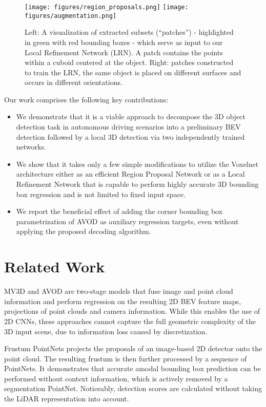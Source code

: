 \documentclass{article}
\begin{document}
\begin{figure}[ht!]
    \centering
    \texttt{[image: figures/region\_proposals.png]} \texttt{[image: figures/augmentation.png]}
    \caption{ Left: A visualization of extracted subsets (``patches'') - highlighted in green with red bounding boxes - which serve as input to our Local Refinement Network (LRN). A patch contains the points within a cuboid centered at the object. Right: patches constructed to train the LRN, the same object is placed on different surfaces and occurs in different orientations.}
    \label{fig:patches_vis}
\end{figure}


Our work comprises the following key contributions: 
\begin{itemize}
\item We demonstrate that it is a viable approach to decompose the 3D object detection task in autonomous driving scenarios into a preliminary BEV detection followed by a local 3D detection via two independently trained networks.
\item We show that it takes only a few simple modifications to utilize the Voxelnet \cite{Zhou2018voxel} architecture either as an efficient Region Proposal Network or as a Local Refinement Network that is capable to perform highly accurate 3D bounding box regression and is not limited to fixed input space. 
\item We report the beneficial effect of adding the corner bounding box parametrization of AVOD \cite{Ku2018avod} as auxiliary regression targets, even without applying the proposed decoding algorithm.
\end{itemize}


\section{Related Work}

MV3D \cite{Chen2017multiview} and AVOD \cite{Ku2018avod} are two-stage models that fuse image and point cloud information and perform regression on the resulting 2D BEV feature maps, projections of point clouds and camera information. While this enables the use of 2D CNNs, these approaches cannot capture the full geometric complexity of the 3D input scene, due to information loss caused by discretization. 

Frustum PointNets \cite{Qi2018fpointnet} projects the proposals of an image-based 2D detector onto the point cloud. The resulting frustum is then further processed by a sequence of PointNets.
It demonstrates that accurate amodal bounding box prediction can be performed without context information, which is actively removed by a segmentation PointNet. Noticeably, detection scores are calculated without taking the LiDAR representation into account.
\end{document}
